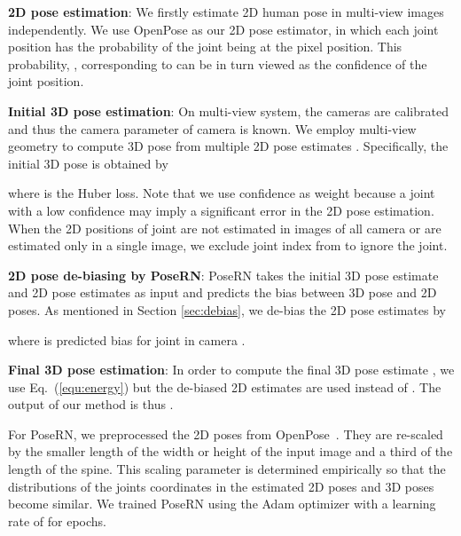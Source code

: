 \documentclass{article}
\begin{document}
\textbf{2D pose estimation}:
We firstly estimate 2D human pose  in multi-view images independently. We use OpenPose \cite{cao2018openpose} as our 2D pose estimator, in which each joint position has the probability of the joint being at the pixel position. This probability, , corresponding to  can be in turn viewed as the confidence of the joint position.  

\textbf{Initial 3D pose estimation}:
On multi-view system, the cameras are calibrated and thus the camera parameter  of camera  is known.  We employ multi-view geometry to compute 3D pose  from multiple 2D pose estimates . Specifically, the initial 3D pose is obtained by 

where  is the Huber loss. Note that we use confidence  as weight because a joint with a low confidence may imply a significant error in the 2D pose estimation. When the 2D positions of joint  are not estimated in images of all camera or are estimated only in a single image, we exclude joint index  from  to ignore the joint. 

\textbf{2D pose de-biasing by PoseRN}:
PoseRN takes the initial 3D pose estimate  and 2D pose estimates  as input and predicts the bias between 3D pose and 2D poses. As mentioned in Section \ref{sec:debias}, we de-bias the 2D pose estimates by

where  is predicted bias for joint  in camera . 

\textbf{Final 3D pose estimation}:
In order to compute the final 3D pose estimate , we use Eq.~(\ref{equ:energy}) but the de-biased 2D estimates  are used instead of . The output of our method is thus .

For PoseRN, we preprocessed the 2D poses from OpenPose~\cite{cao2018openpose}. They are re-scaled by the smaller length of the width or height of the input image and a third of the length of the spine. This scaling parameter is determined empirically so that the distributions of the joints coordinates in the estimated 2D poses and 3D poses become similar. We trained PoseRN using the Adam optimizer
with a learning rate of  for  epochs. 

\vspace{-0.2cm}
\end{document}
